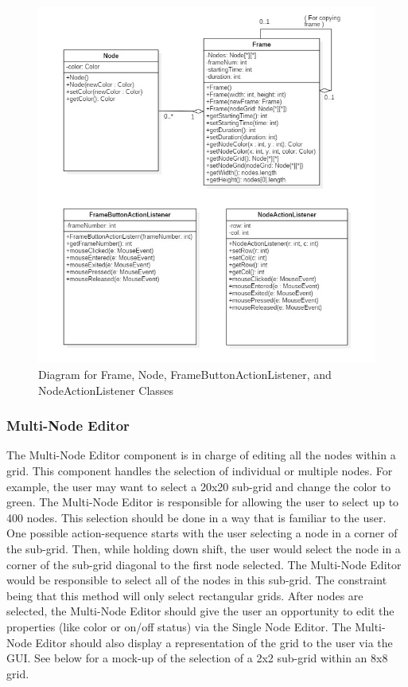 \documentclass[12pt]{article}
\begin{document}
	\begin{figure}[ht!]
    \centering
    \includegraphics[width=0.9\linewidth]{Class_Diagram_Frame_Node_and_ActionListener_Classes.JPG}
    \caption{Diagram for Frame, Node, FrameButtonActionListener, and NodeActionListener Classes}
  \end{figure}
	
	\subsubsection {Multi-Node Editor}
  	The Multi-Node Editor component is in charge of editing all the nodes within a grid. This component handles the selection of individual or multiple nodes. For example, the user may want to select a 20x20 sub-grid and change the color to green. The Multi-Node Editor is responsible for allowing the user to select up to 400 nodes. 
    This selection should be done in a way that is familiar to the user. One possible action-sequence starts with the user selecting a node in a corner of the sub-grid. Then, while holding down shift, the user would select the node in a corner of the sub-grid diagonal to the first node selected. The Multi-Node Editor would be responsible to select all of the nodes in this sub-grid. The constraint being that this method will only select rectangular grids.	
  	After nodes are selected, the Multi-Node Editor should give the user an opportunity to edit the properties (like color or on/off status) via the Single Node Editor.   	
  	The Multi-Node Editor should also display a representation of the grid to the user via the GUI. See below for a mock-up of the selection of a 2x2 sub-grid within an 8x8 grid.
	
\end{document}
